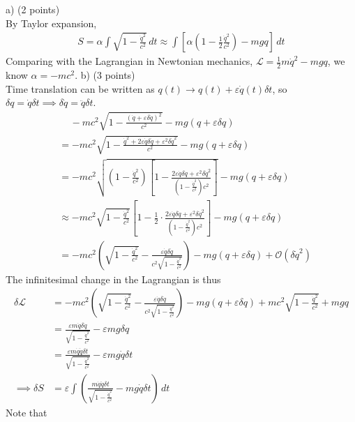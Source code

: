 \documentclass[12pt]{book} %
\numberwithin{equation}{chapter}
\def\a{\alpha}
\def\d{\delta}
\def\e{\varepsilon}
\def\La{\mathcal{L}}
\def\bigO{\mathcal{O}}
\begin{document}
\begin{solbox}
a) (2 points)\\
By Taylor expansion,
\begin{align*}
S=\a \int\sqrt{1-\frac{\dot{q}^{2}}{c^{2}}}\,dt\approx\int\left[\a\left(1-\frac{1}{2}\frac{\dot{q}^{2}}{c^{2}}\right)-mgq\right]\,dt
\end{align*}
Comparing with the Lagrangian in Newtonian mechanics, $\La=\frac{1}{2}m\dot{q}^{2}-mgq$, we know $\a=-mc^{2}$.\bigskip\newline
b) (3 points)\\
Time translation can be written as $q(t)\to q(t)+\e \dot{q}(t)\d t$, so $\d q=\dot{q}\d t\implies \d \dot{q}=\ddot{q}\d t$.
\begin{align*}
&\,\,\,\,\,\,\,-mc^{2}\sqrt{1-\frac{\left(\dot{q}+\e\d\dot{q}\right)^{2}}{c^{2}}}-mg\left(q+\e\d q\right)\\
&=-mc^{2}\sqrt{1-\frac{\dot{q}^{2}+2\e\dot{q}\d\dot{q}+\e^{2}\d\dot{q}^{2}}{c^{2}}}-mg\left(q+\e\d q\right)\\
&=-mc^{2}\sqrt{\left(1-\frac{\dot{q}^{2}}{c^{2}}\right)\left[1-\frac{2\e\dot{q}\d\dot{q}+\e^{2}\d\dot{q}^{2}}{\left(1-\frac{\dot{q}^{2}}{c^{2}}\right)c^{2}}\right]}-mg\left(q+\e\d q\right)\\
&\approx -mc^{2}\sqrt{1-\frac{\dot{q}^{2}}{c^{2}}}\left[1-\frac{1}{2}\cdot\frac{2\e\dot{q}\d\dot{q}+\e^{2}\d\dot{q}^{2}}{\left(1-\frac{\dot{q}^{2}}{c^{2}}\right)c^{2}}\right]-mg\left(q+\e\d q\right)\\
&=-mc^{2}\left(\sqrt{1-\frac{\dot{q}^{2}}{c^{2}}}-\frac{\e\dot{q}\d\dot{q}}{c^{2}\sqrt{1-\frac{\dot{q}^{2}}{c^{2}}}}\right)-mg\left(q+\e\d q\right)+\bigO\left(\d\dot{q}^{2}\right)
\end{align*}
The infinitesimal change in the Lagrangian is thus
\begin{align*}
\d\La&=-mc^{2}\left(\sqrt{1-\frac{\dot{q}^{2}}{c^{2}}}-\frac{\e\dot{q}\d\dot{q}}{c^{2}\sqrt{1-\frac{\dot{q}^{2}}{c^{2}}}}\right)-mg\left(q+\e\d q\right)+mc^{2}\sqrt{1-\frac{\dot{q}^{2}}{c^{2}}}+mgq\\
&=\frac{\e m\dot{q}\d\dot{q}}{\sqrt{1-\frac{\dot{q}^{2}}{c^{2}}}}-\e mg\d q\\
&=\frac{\e m\dot{q}\ddot{q}\d t}{\sqrt{1-\frac{\dot{q}^{2}}{c^{2}}}}-\e mg\dot{q}\d t\\
\implies \d S&=\e\int\left(\frac{m\dot{q}\ddot{q}\d t}{\sqrt{1-\frac{\dot{q}^{2}}{c^{2}}}}-mg\dot{q}\d t\right)\,dt
\end{align*}
Note that 
\begin{align*}

\end{align*}
\end{solbox}
\end{document}
